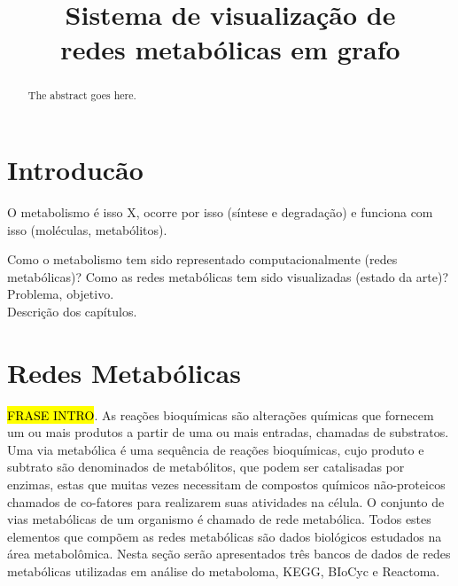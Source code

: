 \documentclass[conference]{IEEEtran}
\begin{document}
\title{Sistema de visualização de\\redes metabólicas em grafo}

\author{
}


\maketitle

\begin{abstract}
The abstract goes here.
\end{abstract}


\section{Introducão}

O metabolismo é isso X, ocorre por isso (síntese e degradação) e funciona com isso (moléculas, metabólitos).

Como o metabolismo tem sido representado computacionalmente (redes metabólicas)? Como as redes metabólicas tem sido visualizadas (estado da arte)? \\
Problema, objetivo. \\
Descrição dos capítulos.


\section{Redes Metabólicas}

\hl{FRASE INTRO}. As reações bioquímicas são alterações químicas que fornecem um ou mais produtos a partir de uma ou mais entradas, chamadas de substratos. Uma via metabólica é uma sequência de reações bioquímicas, cujo produto e subtrato são denominados de metabólitos, que podem ser catalisadas por enzimas, estas que muitas vezes necessitam de compostos químicos não-proteicos chamados de co-fatores para realizarem suas atividades na célula. O conjunto de vias metabólicas de um organismo é chamado de rede metabólica. Todos estes elementos que compõem as redes metabólicas são dados biológicos estudados na área metabolômica. Nesta seção serão apresentados três bancos de dados de redes metabólicas utilizadas em análise do metaboloma, KEGG, BIoCyc e Reactoma.
\end{document}
